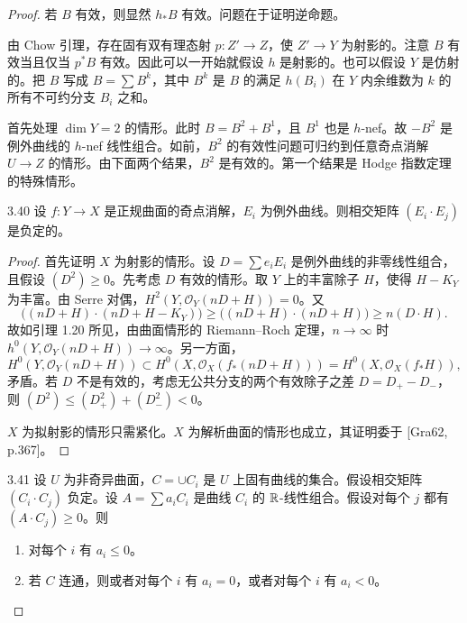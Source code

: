 \begin{proof}
若 $B$ 有效，则显然 $h_*B$ 有效。问题在于证明逆命题。

由 Chow 引理，存在固有双有理态射 $p:Z'\to Z$，使 $Z'\to Y$ 为射影的。注意 $B$ 有效当且仅当 $p^*B$ 有效。因此可以一开始就假设 $h$ 是射影的。也可以假设 $Y$ 是仿射的。把 $B$ 写成 $B=\sum B^k$，其中 $B^k$ 是 $B$ 的满足 $h(B_i)$ 在 $Y$ 内余维数为 $k$ 的所有不可约分支 $B_i$ 之和。

首先处理 $\dim Y=2$ 的情形。此时 $B=B^2+B^1$，且 $B^1$ 也是 $h$-nef。故 $-B^2$ 是例外曲线的 $h$-nef 线性组合。如前，$B^2$ 的有效性问题可归约到任意奇点消解 $U\to Z$ 的情形。由下面两个结果，$B^2$ 是有效的。第一个结果是 Hodge 指数定理的特殊情形。

\begin{lemmap}{3.40}
设 $f:Y\to X$ 是正规曲面的奇点消解，$E_i$ 为例外曲线。则相交矩阵 $(E_i\cdot E_j)$ 是负定的。
\end{lemmap}

\begin{proof}
首先证明 $X$ 为射影的情形。设 $D=\sum e_iE_i$ 是例外曲线的非零线性组合，且假设 $(D^2)\ge0$。先考虑 $D$ 有效的情形。取 $Y$ 上的丰富除子 $H$，使得 $H-K_Y$ 为丰富。由 Serre 对偶，$H^2(Y,\mathcal{O}_Y(nD+H))=0$。又
\[
\bigl((nD+H)\cdot(nD+H-K_Y)\bigr)\ge\bigl((nD+H)\cdot(nD+H)\bigr)\ge n(D\cdot H).
\]
故如引理 1.20 所见，由曲面情形的 Riemann--Roch 定理，$n\to\infty$ 时 $h^0(Y,\mathcal{O}_Y(nD+H))\to\infty$。另一方面，
\[
H^0(Y,\mathcal{O}_Y(nD+H))\subset H^0(X,\mathcal{O}_X(f_*(nD+H)))=H^0(X,\mathcal{O}_X(f_*H)),
\]
矛盾。若 $D$ 不是有效的，考虑无公共分支的两个有效除子之差 $D=D_+-D_-$，则 $(D^2)\le(D_+^2)+(D_-^2)<0$。

$X$ 为拟射影的情形只需紧化。$X$ 为解析曲面的情形也成立，其证明委于 [Gra62, p.367]。
\end{proof}

\begin{lemmap}{3.41}
设 $U$ 为非奇异曲面，$C=\cup C_i$ 是 $U$ 上固有曲线的集合。假设相交矩阵 $(C_i\cdot C_j)$ 负定。设 $A=\sum a_iC_i$ 是曲线 $C_i$ 的 $\mathbb{R}$-线性组合。假设对每个 $j$ 都有 $(A\cdot C_j)\ge0$。则
\begin{enumerate}[label=(\arabic*)]
\item 对每个 $i$ 有 $a_i\le0$。
\item 若 $C$ 连通，则或者对每个 $i$ 有 $a_i=0$，或者对每个 $i$ 有 $a_i<0$。
\end{enumerate}
\end{lemmap}


\end{proof}
